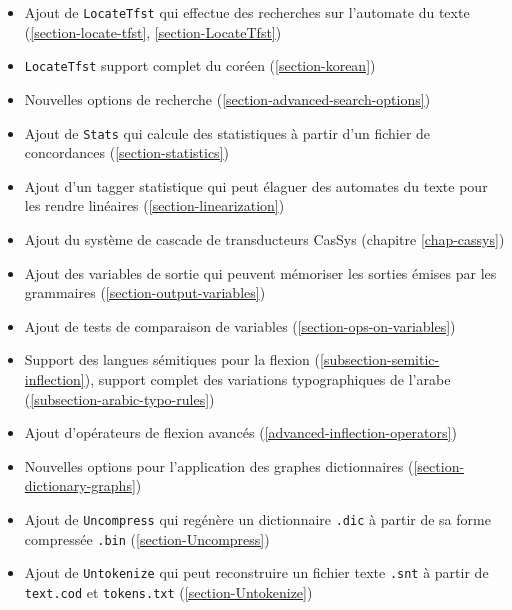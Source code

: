 \begin{itemize}
  \item Ajout de  \verb$LocateTfst$ qui effectue des recherches sur l'automate du texte
 (\ref{section-locate-tfst}, \ref{section-LocateTfst})
 
  \item \verb$LocateTfst$ support complet du coréen (\ref{section-korean})
  	  
  \item Nouvelles options de recherche (\ref{section-advanced-search-options})
  	  
  \item Ajout de \verb$Stats$ qui calcule des statistiques à partir d'un fichier de concordances
 (\ref{section-statistics})
 
  \item Ajout d'un tagger statistique qui peut élaguer des automates du texte pour les rendre
  	  linéaires (\ref{section-linearization})
  	  
  \item Ajout du système de cascade de transducteurs CasSys (chapitre \ref{chap-cassys})
  	  
  \item Ajout des variables de sortie qui peuvent mémoriser les sorties émises par les
  	  grammaires (\ref{section-output-variables})
  	  
  \item Ajout de tests de comparaison de variables (\ref{section-ops-on-variables})
  	  
  \item Support des langues sémitiques pour la flexion (\ref{subsection-semitic-inflection}),
  	  support complet des variations typographiques de l'arabe
  	  (\ref{subsection-arabic-typo-rules})
  	  
  \item Ajout d'opérateurs de flexion avancés (\ref{advanced-inflection-operators})

  \item Nouvelles options pour l'application des graphes dictionnaires
  	  (\ref{section-dictionary-graphs})
  	  
  \item Ajout de \verb$Uncompress$ qui regénère un dictionnaire \verb$.dic$ à partir de sa forme
  	  compressée \verb$.bin$ (\ref{section-Uncompress})

  \item Ajout de \verb$Untokenize$ qui peut reconstruire un fichier texte \verb$.snt$
	à partir de  \verb$text.cod$ et \verb$tokens.txt$ (\ref{section-Untokenize})


\end{itemize}
